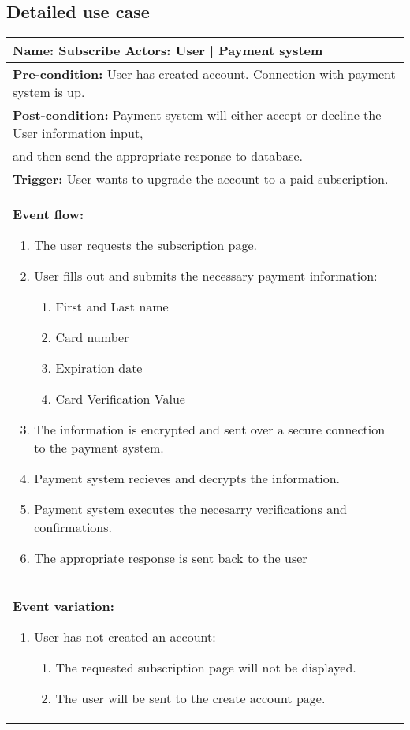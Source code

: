 \subsection{Detailed use case}

\begin{tabular}{|p{16.5cm}|}
\hline
\textbf{Name:} Subscribe \vline   \textbf{ Actors:} User | Payment system \\ \hline
\textbf{Pre-condition:} User has created account. Connection with payment system is up.\\ \hline
\textbf{Post-condition:} Payment system will either accept or decline the User information input, \\and then send the appropriate response to database. \\ \hline
\textbf{Trigger: } User wants to upgrade the account to a paid subscription. \\ \hline
\textbf{Event flow: }
\begin{enumerate}
	\item The user requests the subscription page.
	\item User fills out and submits the necessary payment information:
	\begin{enumerate}
		\item First and Last name
		\item Card number
		\item Expiration date
		\item Card Verification Value
	\end{enumerate}
	\item The information is encrypted and sent over a secure connection to the payment system.
	\item Payment system recieves and decrypts the information.
	\item Payment system executes the necesarry verifications and confirmations.
	\item The appropriate response is sent back to the user
\end{enumerate}
\\ \hline
\textbf{Event variation: }
\begin{enumerate}
	\item User has not created an account:
	\begin{enumerate}
 		\item The requested subscription page will not be displayed.
		\item The user will be sent to the create account page.
	\end{enumerate}

\end{enumerate}
\end{tabular}
